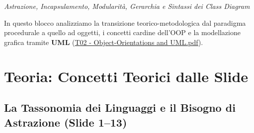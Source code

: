 \documentclass[11pt,a4paper,oneside]{report}
\begin{document}
{\small\sffamily\color{accentblue!80!black}\textit{Astrazione, Incapsulamento, Modularità, Gerarchia e Sintassi dei Class Diagram}}

\vspace{0.8em}

In questo blocco analizziamo la transizione teorico-metodologica dal
paradigma procedurale a quello ad oggetti, i concetti cardine dell'OOP e
la modellazione grafica tramite \textbf{UML}
(\href{file:///home/wally/Documenti/GitHub/Programmazione-II/25-26/Teoria-e-Esercitazioni/Slides-20260902/T02\%20-\%20Object-Orientations\%20and\%20UML.pdf}{T02
- Object-Orientations and UML.pdf}).

\section{Teoria: Concetti Teorici dalle
Slide}\label{chap02_teoria-concetti-teorici-dalle-slide}

\subsection{La Tassonomia dei Linguaggi e il Bisogno di Astrazione
(Slide
1--13)}\label{chap02_la-tassonomia-dei-linguaggi-e-il-bisogno-di-astrazione-slide-113}
\end{document}
